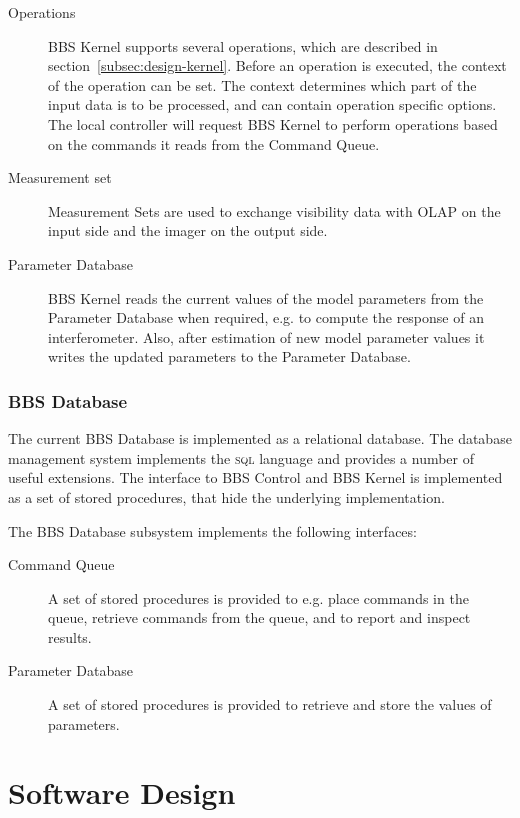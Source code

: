 \documentclass[10pt]{lofar}
\begin{document}
\begin{description}
\item [Operations]
BBS Kernel supports several operations, which are described in
section~\ref{subsec:design-kernel}. Before an operation is executed, the context
of the operation can be set. The context determines which part of the input data
is to be processed, and can contain operation specific options. The local
controller will request BBS Kernel to perform operations based on the commands
it reads from the Command Queue.
\item [Measurement set]
Measurement Sets are used to exchange visibility data with OLAP on the input
side and the imager on the output side.
\item [Parameter Database]
BBS Kernel reads the current values of the model parameters from the Parameter
Database when required, e.g. to compute the response of an interferometer. Also,
after estimation of new model parameter values it writes the updated parameters
to the Parameter Database.
\end{description}

\subsubsection{BBS Database}
\label{subsubsec:interf-database}

The current BBS Database is implemented as a relational database. The database
management system implements the \textsc{sql} language and provides a number of
useful extensions. The interface to BBS Control and BBS Kernel is implemented as
a set of stored procedures, that hide the underlying implementation.

The BBS Database subsystem implements the following interfaces:
\begin{description}
\item [Command Queue]
A set of stored procedures is provided to e.g. place commands in the queue,
retrieve commands from the queue, and to report and inspect results.
\item [Parameter Database]
A set of stored procedures is provided to retrieve and store the values of
parameters.
\end{description}

\cleardoublepage

\section{Software Design}
\label{sec:software-design}
\end{document}
